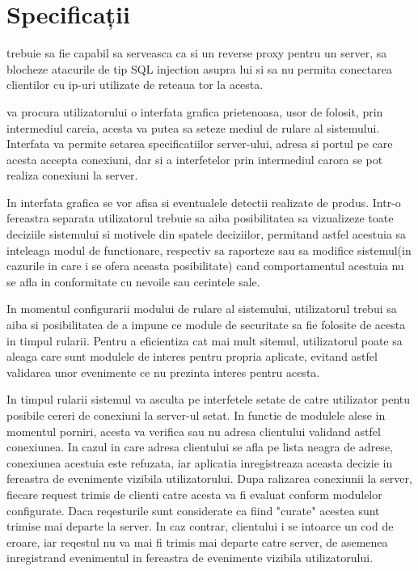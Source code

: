  \section{Specificații}
\textit{\thesistitle} trebuie sa fie capabil sa serveasca ca si un reverse proxy pentru un server, sa blocheze atacurile de tip SQL injection asupra lui si sa nu permita conectarea clientilor cu ip-uri utilizate de reteaua tor la acesta.

\textit{\thesistitle} va procura utilizatorului o interfata grafica prietenoasa, usor de folosit, prin intermediul careia, acesta va putea sa seteze mediul de rulare al sistemului. Interfata va permite setarea specificatiilor server-ului, adresa si portul pe care acesta accepta conexiuni, dar si a interfetelor prin intermediul carora se pot realiza conexiuni la server. 

In interfata grafica se vor afisa si eventualele detectii realizate de produs. Intr-o fereastra separata utilizatorul trebuie sa aiba posibilitatea sa vizualizeze toate deciziile sistemului si motivele din spatele deciziilor, permitand astfel acestuia sa inteleaga modul de functionare, respectiv sa raporteze sau sa modifice sistemul(in cazurile in care i se ofera aceasta posibilitate) cand comportamentul acestuia nu se afla in conformitate cu nevoile sau cerintele sale.

 In momentul configurarii modului de rulare al sistemului, utilizatorul trebui sa aiba si posibilitatea de a impune ce module de securitate sa fie folosite de acesta in timpul rularii. Pentru a eficientiza cat mai mult sitemul, utilizatorul poate sa aleaga care sunt modulele de interes pentru propria aplicate, evitand astfel validarea unor evenimente ce nu prezinta interes pentru acesta.
 
 
In timpul rularii sistemul va asculta pe interfetele setate de catre utilizator pentu posibile cereri de conexiuni la server-ul setat. In functie de modulele alese in momentul porniri, acesta va verifica sau nu adresa clientului validand astfel conexiunea. In cazul in care adresa clientului se afla pe lista neagra de adrese, conexiunea acestuia este refuzata, iar aplicatia inregistreaza aceasta decizie in fereastra de evenimente vizibila utilizatorului. Dupa ralizarea conexiunii la server, fiecare request trimis de clienti catre acesta va fi evaluat conform modulelor configurate. Daca reqesturile sunt considerate ca fiind "curate" acestea sunt trimise mai departe la server. In caz contrar, clientului i se intoarce un cod de eroare, iar reqestul nu va mai fi trimis mai departe catre server, de asemenea inregistrand evenimentul in fereastra de evenimente vizibila utilizatorului.


